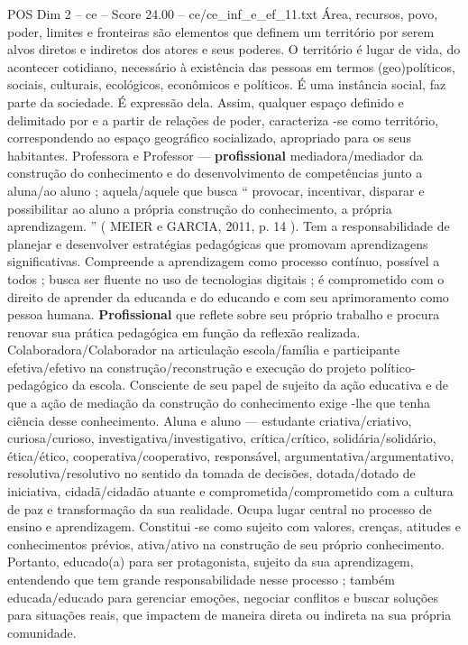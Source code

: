 \begin{textsample}{POS Dim 2 – ce – Score 24.00 – ce/ce\_inf\_e\_ef\_11.txt}
Área, recursos, povo, poder, limites e fronteiras são elementos que definem um território por serem alvos diretos e indiretos dos atores e seus poderes.
O território é lugar de vida, do acontecer cotidiano, necessário à existência das pessoas em termos (geo)políticos, sociais, culturais, ecológicos, econômicos e políticos.
É uma instância social, faz parte da sociedade.
É expressão dela.
Assim, qualquer espaço definido e delimitado por e a partir de relações de poder, caracteriza -se como território, correspondendo ao espaço geográfico socializado, apropriado para os seus habitantes.
Professora e Professor — \textbf{profissional} mediadora/mediador da construção do conhecimento e do desenvolvimento de competências junto a aluna/ao aluno ; aquela/aquele que busca “ provocar, incentivar, disparar e possibilitar ao aluno a própria construção do conhecimento, a própria aprendizagem. ” ( MEIER e GARCIA, 2011, p. 14 ).
Tem a responsabilidade de planejar e desenvolver estratégias pedagógicas que promovam aprendizagens significativas.
Compreende a aprendizagem como processo contínuo, possível a todos ; busca ser fluente no uso de tecnologias digitais ; é comprometido com o direito de aprender da educanda e do educando e com seu aprimoramento como pessoa humana. \textbf{Profissional} que reflete sobre seu próprio trabalho e procura renovar sua prática pedagógica em função da reflexão realizada.
Colaboradora/Colaborador na articulação escola/família e participante efetiva/efetivo na construção/reconstrução e execução do projeto político-pedagógico da escola.
Consciente de seu papel de sujeito da ação educativa e de que a ação de mediação da construção do conhecimento exige -lhe que tenha ciência desse conhecimento.
Aluna e aluno — estudante criativa/criativo, curiosa/curioso, investigativa/investigativo, crítica/crítico, solidária/solidário, ética/ético, cooperativa/cooperativo, responsável, argumentativa/argumentativo, resolutiva/resolutivo no sentido da tomada de decisões, dotada/dotado de iniciativa, cidadã/cidadão atuante e comprometida/comprometido com a cultura de paz e transformação da sua realidade.
Ocupa lugar central no processo de ensino e aprendizagem.
Constitui -se como sujeito com valores, crenças, atitudes e conhecimentos prévios, ativa/ativo na construção de seu próprio conhecimento.
Portanto, educado(a) para ser protagonista, sujeito da sua aprendizagem, entendendo que tem grande responsabilidade nesse processo ; também educada/educado para gerenciar emoções, negociar conflitos e buscar soluções para situações reais, que impactem de maneira direta ou indireta na sua própria comunidade.

\end{textsample}
